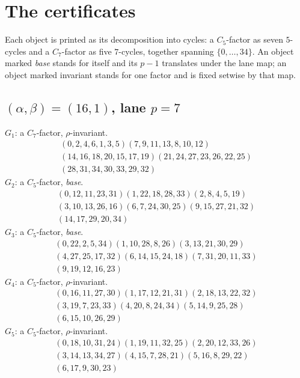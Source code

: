 \documentclass[11pt]{amsart}
\begin{document}
\section{The certificates}\label{sec:certs}

Each object is printed as its decomposition into cycles: a $C_5$-factor
as seven $5$-cycles and a $C_7$-factor as five $7$-cycles, together
spanning $\{0,\dots,34\}$. An object marked \emph{base} stands for
itself and its $p-1$ translates under the lane map; an object marked
invariant stands for one factor and is fixed setwise by that map.

\subsection*{$(\alpha,\beta)=(16,1)$, lane $p=7$}
\smallskip\noindent $G_{1}$: a $C_7$-factor, $\rho$-invariant.
\begin{gather*}
  (0,2,4,6,1,3,5)(7,9,11,13,8,10,12) \\
  (14,16,18,20,15,17,19)(21,24,27,23,26,22,25) \\
  (28,31,34,30,33,29,32)
\end{gather*}
\smallskip\noindent $G_{2}$: a $C_5$-factor, \emph{base}.
\begin{gather*}
  (0,12,11,23,31)(1,22,18,28,33)(2,8,4,5,19) \\
  (3,10,13,26,16)(6,7,24,30,25)(9,15,27,21,32) \\
  (14,17,29,20,34)
\end{gather*}
\smallskip\noindent $G_{3}$: a $C_5$-factor, \emph{base}.
\begin{gather*}
  (0,22,2,5,34)(1,10,28,8,26)(3,13,21,30,29) \\
  (4,27,25,17,32)(6,14,15,24,18)(7,31,20,11,33) \\
  (9,19,12,16,23)
\end{gather*}
\smallskip\noindent $G_{4}$: a $C_5$-factor, $\rho$-invariant.
\begin{gather*}
  (0,16,11,27,30)(1,17,12,21,31)(2,18,13,22,32) \\
  (3,19,7,23,33)(4,20,8,24,34)(5,14,9,25,28) \\
  (6,15,10,26,29)
\end{gather*}
\smallskip\noindent $G_{5}$: a $C_5$-factor, $\rho$-invariant.
\begin{gather*}
  (0,18,10,31,24)(1,19,11,32,25)(2,20,12,33,26) \\
  (3,14,13,34,27)(4,15,7,28,21)(5,16,8,29,22) \\
  (6,17,9,30,23)
\end{gather*}
\end{document}
